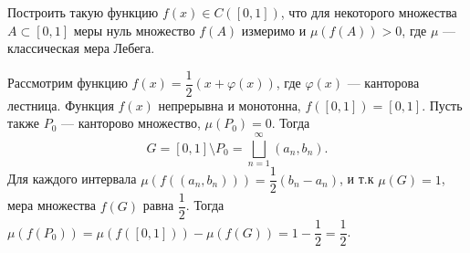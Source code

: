 \begin{task}{8}
Построить такую функцию $f(x) \in C([0, 1])$, что для некоторого множества $A \subset [0, 1]$ меры нуль множество $f(A)$ измеримо и $\mu(f(A)) > 0$, где $\mu$ --- классическая мера Лебега.
\end{task}

\begin{solution}
Рассмотрим функцию $f(x) = \dfrac{1}{2}(x + \varphi(x))$, где $\varphi(x)$ --- канторова лестница. Функция $f(x)$ непрерывна и монотонна, $f([0, 1]) = [0, 1]$. Пусть также $P_0$ --- канторово множество, $\mu(P_0) = 0$. Тогда
$$ G = [0, 1] \setminus P_0 = \bigsqcup_{n=1}^{\infty} (a_n, b_n).$$
Для каждого интервала $\mu(f((a_n, b_n))) = \dfrac{1}{2}(b_n - a_n)$, и т.к $\mu(G) = 1$, мера множества $f(G)$ равна $\dfrac{1}{2}$. Тогда $\mu(f(P_0)) = \mu(f([0, 1])) - \mu(f(G)) = 1 - \dfrac{1}{2} = \dfrac{1}{2}$.
\end{solution}